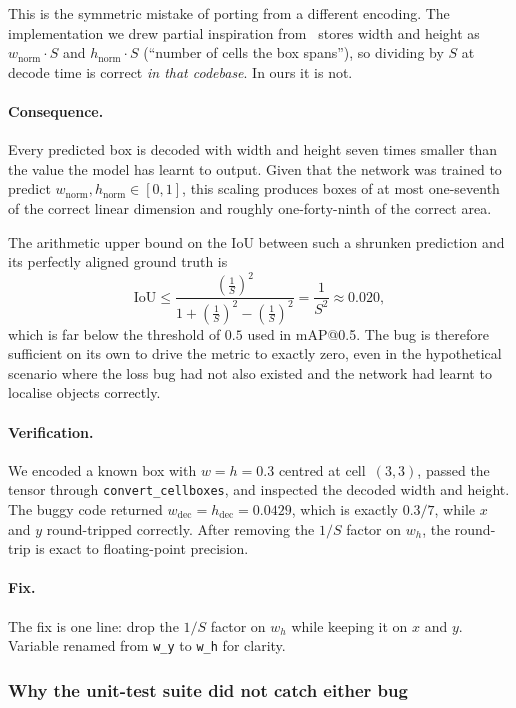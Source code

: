 \noindent This is the symmetric mistake of porting from a different
encoding. The implementation we drew partial inspiration
from~\citep{persson2020yolo} stores width and height as $w_{\text{norm}}\cdot S$
and $h_{\text{norm}}\cdot S$ (``number of cells the box spans''), so dividing
by $S$ at decode time is correct \emph{in that codebase}. In ours it is not.

\paragraph{Consequence.} Every predicted box is decoded with width and height
seven times smaller than the value the model has learnt to output. Given that
the network was trained to predict $w_{\text{norm}}, h_{\text{norm}} \in [0,1]$,
this scaling produces boxes of at most one-seventh of the correct linear
dimension and roughly one-forty-ninth of the correct area.

The arithmetic upper bound on the IoU between such a shrunken prediction and
its perfectly aligned ground truth is
\[
  \text{IoU} \le \frac{(\tfrac{1}{S})^2}{1 + (\tfrac{1}{S})^2 - (\tfrac{1}{S})^2}
              = \frac{1}{S^2} \approx 0.020,
\]
which is far below the threshold of $0.5$ used in mAP@0.5. The bug is
therefore sufficient on its own to drive the metric to exactly zero, even in
the hypothetical scenario where the loss bug had not also existed and the
network had learnt to localise objects correctly.

\paragraph{Verification.} We encoded a known box with $w=h=0.3$ centred at
cell~$(3,3)$, passed the tensor through \texttt{convert\_cellboxes}, and
inspected the decoded width and height. The buggy code returned
$w_{\text{dec}} = h_{\text{dec}} = 0.0429$, which is exactly $0.3/7$, while
$x$ and $y$ round-tripped correctly. After removing the $1/S$ factor on
$w_h$, the round-trip is exact to floating-point precision.

\paragraph{Fix.} The fix is one line: drop the $1/S$ factor on $w_h$ while
keeping it on $x$ and $y$. Variable renamed from \texttt{w\_y} to \texttt{w\_h}
for clarity.

\subsubsection{Why the unit-test suite did not catch either bug}
\label{sec:bug:tests}

